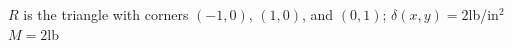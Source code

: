 {$R$ is the triangle with corners $(-1,0)$, $(1,0)$, and $(0,1)$; $\delta(x,y) = 2$lb/in$^2$
}
{$M = 2$lb%
}